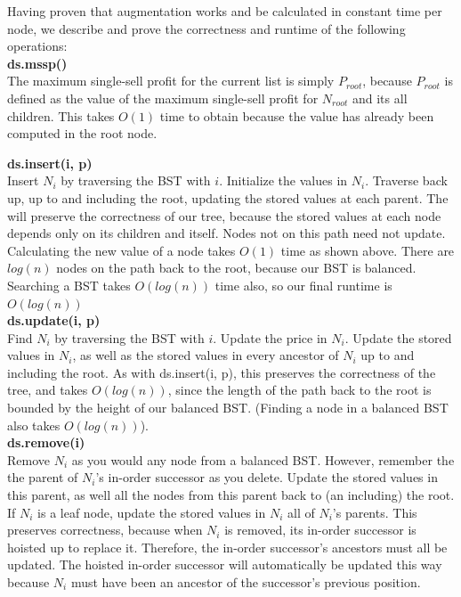 \documentclass{article}
\theoremstyle{casestyle}
\begin{document}
Having proven that augmentation works and be calculated in constant time per node, we describe and prove the correctness and runtime of the following operations:\\

\textbf{ds.mssp()}\\
The maximum single-sell profit for the current list is simply $P_{root}$, because $P_{root}$ is defined as the value of the maximum single-sell profit for $N_{root}$ and its all children. This takes $O(1)$ time to obtain because the value has already been computed in the root node.

\textbf{ds.insert(i, p)} \\
Insert $N_i$ by traversing the BST with $i$. Initialize the values in $N_i$. Traverse back up, up to and including the root, updating the stored values at each parent. The will preserve the correctness of our tree, because the stored values at each node depends only on its children and itself. Nodes not on this path need not update.\\

Calculating the new value of a node takes $O(1)$ time as shown above. There are $log(n)$ nodes on the path back to the root, because our BST is balanced. Searching a BST takes $O(log(n))$ time also, so our final runtime is $O(log(n))$\\

\textbf{ds.update(i, p)}\\
Find $N_i$ by traversing the BST with $i$. Update the price in $N_i$. Update the stored values in $N_i$, as well as the stored values in every ancestor of $N_i$ up to and including the root. As with ds.insert(i, p), this preserves the correctness of the tree, and takes $O(log(n))$, since the length of the path back to the root is bounded by the height of our balanced BST. (Finding a node in a balanced BST also takes $O(log(n))$). \\

\textbf{ds.remove(i)}\\
Remove $N_i$ as you would any node from a balanced BST. However, remember the the parent of $N_i$'s in-order successor as you delete. Update the stored values in this parent, as well all the nodes from this parent back to (an including) the root. If $N_i$ is a leaf node, update the stored values in $N_i$ all of $N_i$'s parents. This preserves correctness, because when $N_i$ is removed, its in-order successor is hoisted up to replace it. Therefore, the in-order successor's ancestors must all be updated. The hoisted in-order successor will automatically be updated this way because $N_i$ must have been an ancestor of the successor's previous position.\\
\end{document}
